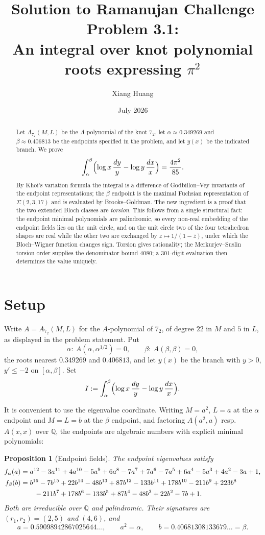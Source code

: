 \documentclass[11pt]{article}
\title{Solution to Ramanujan Challenge Problem 3.1:\\[4pt]
An integral over knot polynomial roots expressing $\pi^2$}
\author{Xiang Huang}
\date{July 2026}
\newtheorem{proposition}[theorem]{Proposition}
\theoremstyle{remark}
\newcommand{\QQ}{\mathbb{Q}}
\begin{document}
\maketitle

\begin{abstract}
Let $A_{7_2}(M,L)$ be the $A$-polynomial of the knot $7_2$, let
$\alpha\approx0.349269$ and $\beta\approx0.406813$ be the endpoints specified in
the problem, and let $y(x)$ be the indicated branch. We prove
\[
\int_\alpha^\beta\Bigl(\log x\,\frac{dy}{y}-\log y\,\frac{dx}{x}\Bigr)
=\frac{4\pi^2}{85}.
\]
By Khoi's variation formula the integral is a difference of Godbillon--Vey
invariants of the endpoint representations; the $\beta$ endpoint is the maximal
Fuchsian representation of $\Sigma(2,3,17)$ and is evaluated by Brooks--Goldman.
The new ingredient is a proof that the two extended Bloch classes are
\emph{torsion}. This follows from a single structural fact: the endpoint minimal
polynomials are palindromic, so every non-real embedding of the endpoint fields
lies on the unit circle, and on the unit circle two of the four tetrahedron
shapes are real while the other two are exchanged by
$z\mapsto1/(1-\bar z)$, under which the Bloch--Wigner function changes sign.
Torsion gives rationality; the Merkurjev--Suslin torsion order supplies the
denominator bound $4080$; a $301$-digit evaluation then determines the value
uniquely.
\end{abstract}

\section{Setup}

Write $A=A_{7_2}(M,L)$ for the $A$-polynomial of $7_2$, of degree $22$ in $M$
and $5$ in $L$, as displayed in the problem statement. Put
\[
\alpha:\ A(\alpha,\alpha^{1/2})=0,\qquad
\beta:\ A(\beta,\beta)=0,
\]
the roots nearest $0.349269$ and $0.406813$, and let $y(x)$ be the branch with
$y>0$, $y'\le-2$ on $[\alpha,\beta]$. Set
\[
I:=\int_\alpha^\beta\Bigl(\log x\,\frac{dy}{y}-\log y\,\frac{dx}{x}\Bigr).
\]

It is convenient to use the eigenvalue coordinate. Writing $M=a^2$, $L=a$ at the
$\alpha$ endpoint and $M=L=b$ at the $\beta$ endpoint, and factoring
$A(a^2,a)$ resp.\ $A(x,x)$ over $\QQ$, the endpoints are algebraic numbers with
explicit minimal polynomials:

\begin{proposition}[Endpoint fields]\label{prop:fields}
The endpoint eigenvalues satisfy
\begin{align}
f_\alpha(a)&=a^{12}-3a^{11}+4a^{10}-5a^{9}+6a^{8}-7a^{7}+7a^{6}
 -7a^{5}+6a^{4}-5a^{3}+4a^{2}-3a+1,\label{eq:falpha}\\
f_\beta(b)&=b^{16}-7b^{15}+22b^{14}-48b^{13}+87b^{12}-133b^{11}+178b^{10}
 -211b^{9}+223b^{8}\notag\\
 &\qquad-211b^{7}+178b^{6}-133b^{5}+87b^{4}-48b^{3}+22b^{2}-7b+1.
 \label{eq:fbeta}
\end{align}
Both are irreducible over $\QQ$ and \emph{palindromic}. Their signatures are
$(r_1,r_2)=(2,5)$ and $(4,6)$, and
\[
a=0.59098942867025644\ldots,\qquad a^2=\alpha,\qquad
b=0.40681308133679\ldots=\beta .
\]
\end{proposition}
\end{document}
